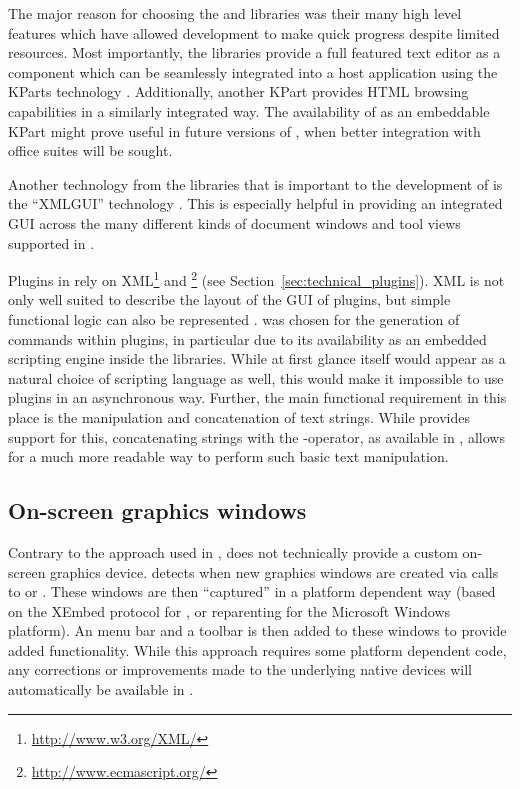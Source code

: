 \documentclass[article,shortnames]{jss}
\begin{document}
The major reason for choosing the  and  libraries was their 
many high level features which have allowed  development to make quick
progress despite limited resources. Most importantly, the  libraries provide a
full featured text editor \citep{CullmannND} as a component which can be
seamlessly integrated into a host application using the KParts technology
\citep{Faure2000}. Additionally, another KPart provides HTML browsing capabilities in a
similarly integrated way. The availability of  \citep{KWord} as an
embeddable KPart might prove useful in future versions of , when better
integration with office suites will be sought.

Another technology from the  libraries that is important to the development
of  is the ``XMLGUI'' technology
\citep{Faure2000}. This is especially helpful in providing an integrated GUI across
the many different kinds of document windows and tool views supported in .

Plugins in  rely on XML\footnote{\url{http://www.w3.org/XML/}}
and \footnote{\url{http://www.ecmascript.org/}} (see Section~\ref{sec:technical_plugins}). XML is not
only well suited to describe the layout of the GUI of plugins, but simple
functional logic can also be represented \citep[see also][]{Visne2009}.  was
chosen for the generation of  commands within plugins, in particular due to its
availability as an embedded scripting engine inside the  libraries. While at
first glance  itself would appear as a natural choice of scripting language as
well, this would make it impossible to use plugins in an asynchronous way.
Further, the main functional requirement in this place is the manipulation and
concatenation of text strings. While  provides support for this, concatenating
strings with the \code{+}-operator, as available in , allows for a much
more readable way to perform such basic text manipulation.

\subsection{On-screen graphics windows}
\label{sec:technical_graphics}
Contrary to the approach used in  \citep{JGR2010},  does
not technically provide a custom on-screen graphics device.  detects when
new graphics windows are created via calls to  or . These windows
are then ``captured'' in a platform dependent way (based on the XEmbed \citep{Ettrich2002} protocol
for , or reparenting for the Microsoft Windows platform). An  menu bar and a
toolbar is then added to these windows to provide added functionality. While
this approach requires some platform dependent code, any corrections or
improvements made to the underlying  native devices will automatically be
available in .
\end{document}
